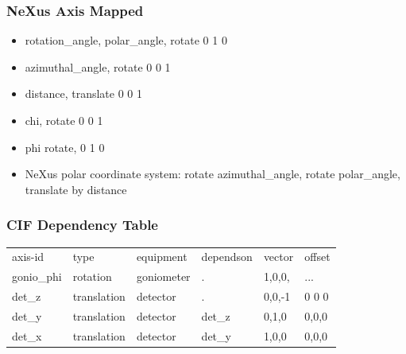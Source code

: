 \documentclass{beamer}
\begin{document}
\begin{frame} \frametitle{NeXus Axis Mapped}
\begin{itemize}
\item rotation\_angle, polar\_angle, rotate 0 1 0
\item azimuthal\_angle, rotate 0 0 1
\item distance, translate 0 0  1
\item chi, rotate 0 0 1
\item phi rotate, 0 1 0
\item NeXus polar coordinate system: rotate azimuthal\_angle, rotate polar\_angle, 
 translate by distance
\end{itemize}
\end{frame}

\begin{frame} \frametitle{CIF Dependency Table}
\begin{tabular}{llllll}
axis-id &type &equipment&dependson &vector & offset\\
gonio\_phi &rotation& goniometer & . &1,0,0,& ...\\
det\_z&translation&detector& .& 0,0,-1& 0 0 0\\
det\_y&translation&detector&det\_z&0,1,0&0,0,0\\
det\_x&translation&detector&det\_y&1,0,0&0,0,0\\
\end{tabular}
\end{frame}
\end{document}
